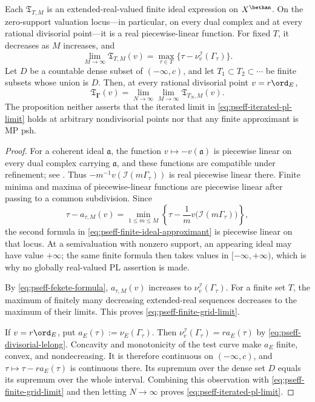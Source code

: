 \begin{proposition}\label{prop:pseff-divisorial-pl-approximation}
Each \(\mathfrak T_{T,M}\) is an extended-real-valued finite ideal
expression on \(X^{\bethan}\).  On the zero-support valuation locus---in
particular, on every dual complex and at every rational divisorial
point---it is a real piecewise-linear function.  For fixed \(T\), it
decreases as \(M\) increases, and
\[
 \lim_{M\to\infty}\mathfrak T_{T,M}(v)
 =\max_{\tau\in T}
    \{\tau-\nu_v^{\mathcal I}(\Gamma_\tau)\}.
\tag{71.37}\label{eq:pseff-finite-grid-limit}
\]
Let \(D\) be a countable dense subset of \(( -\infty,c)\), and let
\(T_1\subset T_2\subset\cdots\) be finite subsets whose union is \(D\).
Then, at every rational divisorial point \(v=r\ord_E\),
\[
 \mathfrak T_{\boldsymbol\Gamma}(v)
 =\lim_{N\to\infty}\lim_{M\to\infty}
       \mathfrak T_{T_N,M}(v).
\tag{71.38}\label{eq:pseff-iterated-pl-limit}
\]
The proposition neither asserts that the iterated limit in
\eqref{eq:pseff-iterated-pl-limit} holds at arbitrary nondivisorial
points nor that any finite approximant is MP psh.
\end{proposition}

\begin{proof}
For a coherent ideal \(\mathfrak a\), the function
\(v\mapsto-v(\mathfrak a)\) is piecewise linear on every dual complex
carrying \(\mathfrak a\), and these functions are compatible under
refinement; see .  Thus
\(-m^{-1}v(\mathcal I(m\Gamma_\tau))\) is real piecewise linear there.
Finite minima and maxima of piecewise-linear functions are piecewise
linear after passing to a common subdivision.  Since
\[
 \tau-a_{\tau,M}(v)
 =\min_{1\leq m\leq M}
   \left\{\tau-\frac1m
             v\bigl(\mathcal I(m\Gamma_\tau)\bigr)\right\},
\]
the second formula in \eqref{eq:pseff-finite-ideal-approximant} is
piecewise linear on that locus.  At a semivaluation with nonzero support,
an appearing ideal may have value \(+\infty\); the same finite formula then
takes values in \([ -\infty,+\infty)\), which is why no globally
real-valued PL assertion is made.

By \eqref{eq:pseff-fekete-formula},
\(a_{\tau,M}(v)\) increases to
\(\nu_v^{\mathcal I}(\Gamma_\tau)\).  For a finite set \(T\), the maximum
of finitely many decreasing extended-real sequences decreases to the
maximum of their limits.  This proves
\eqref{eq:pseff-finite-grid-limit}.

If \(v=r\ord_E\), put
\(a_E(\tau):=\nu_E(\Gamma_\tau)\).  Then
\(\nu_v^{\mathcal I}(\Gamma_\tau)=r a_E(\tau)\) by
\eqref{eq:pseff-divisorial-lelong}.  Concavity and monotonicity of the test
curve make \(a_E\) finite, convex, and nondecreasing.  It is therefore
continuous on \(( -\infty,c)\), and
\(\tau\mapsto\tau-r a_E(\tau)\) is continuous there.  Its supremum over
the dense set \(D\) equals its supremum over the whole interval.
Combining this observation with \eqref{eq:pseff-finite-grid-limit} and
then letting \(N\to\infty\) proves
\eqref{eq:pseff-iterated-pl-limit}.
\end{proof}

